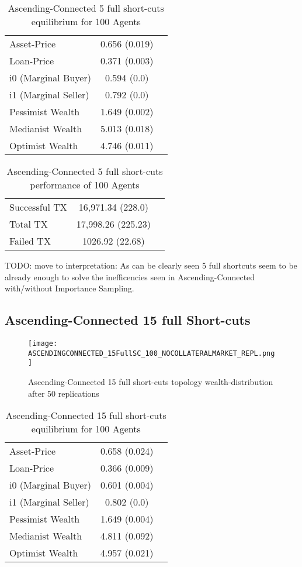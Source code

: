 \documentclass[Bachelorarbeit.tex]{subfiles}
\begin{document}
\begin{table}[h]
	\caption{Ascending-Connected 5 full short-cuts equilibrium for 100 Agents}
	\centering
	\begin{tabular} { l c r }
		\hline
		Asset-Price & 0.656 (0.019) \\
		Loan-Price & 0.371 (0.003) \\
		i0 (Marginal Buyer) & 0.594 (0.0) \\
		i1 (Marginal Seller) & 0.792 (0.0) \\
		Pessimist Wealth & 1.649 (0.002) \\
		Medianist Wealth & 5.013 (0.018) \\
		Optimist Wealth & 4.746 (0.011) \\
		\hline
	\end{tabular}
\end{table} 

\begin{table}[h]
	\caption{Ascending-Connected 5 full short-cuts performance of 100 Agents}
	\centering
	\begin{tabular} { l c r }
		\hline
		Successful TX & 16,971.34 (228.0) \\
		Total TX & 17,998.26 (225.23) \\
		Failed TX & 1026.92 (22.68) \\
		\hline
	\end{tabular}
\end{table}

TODO: move to interpretation: As can be clearly seen 5 full shortcuts seem to be already enough to solve the inefficencies seen in Ascending-Connected with/without Importance Sampling.

\subsection{Ascending-Connected 15 full Short-cuts }
\begin{figure}[!htbp]
	\centering
  \texttt{[image: ASCENDINGCONNECTED\_15FullSC\_100\_NOCOLLATERALMARKET\_REPL.png]}
	\caption{Ascending-Connected 15 full short-cuts topology wealth-distribution after 50 replications}
	\label{fig1}
\end{figure}

\begin{table}[h]
	\caption{Ascending-Connected 15 full short-cuts equilibrium for 100 Agents}
	\centering
	\begin{tabular} { l c r }
		\hline
		Asset-Price & 0.658 (0.024) \\
		Loan-Price & 0.366 (0.009) \\
		i0 (Marginal Buyer) & 0.601 (0.004) \\
		i1 (Marginal Seller) & 0.802 (0.0) \\
		Pessimist Wealth & 1.649 (0.004) \\
		Medianist Wealth & 4.811 (0.092) \\
		Optimist Wealth & 4.957 (0.021) \\
		\hline
	\end{tabular}
\end{table} 
\end{document}
